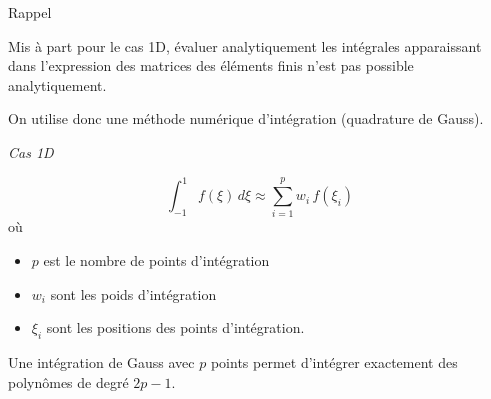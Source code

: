 \documentclass[
mode=present,    %
paper=a4paper,   %
orient=landscape,
display=slides,   %
size=10pt,     %
style=romain   %
]{powerdot}
\begin{document}
\begin{slide}{Rappel}

Mis à part pour le cas 1D, évaluer analytiquement les intégrales apparaissant dans l'expression des matrices des éléments finis n'est pas possible analytiquement.

On utilise donc une méthode numérique d'intégration (quadrature de Gauss).

\bigskip

\emph{Cas 1D}

\begin{equation*}
    \int_{-1}^1 f(\xi) \,d\xi \approx \sum_{i=1}^p w_i\, f(\xi_i)
\end{equation*}
où
\begin{itemize}
    \item $p$ est le nombre de points d'intégration
    \item $w_i$ sont les poids d'intégration
    \item $\xi_i$ sont les positions des points d'intégration.
\end{itemize}

Une intégration de Gauss avec $p$ points permet d'intégrer exactement des polynômes de degré $2p-1$.

\end{slide}
\end{document}
